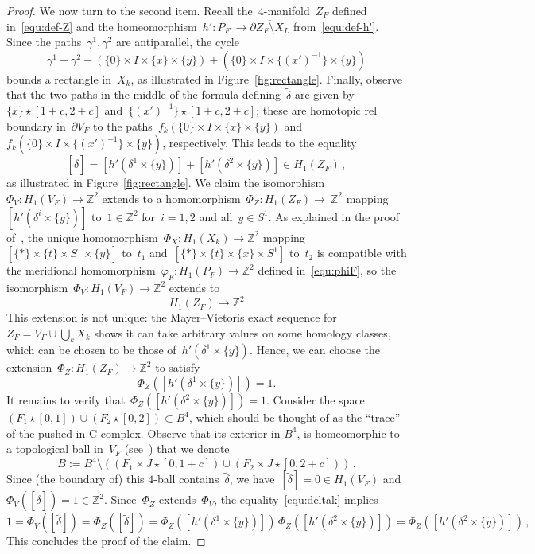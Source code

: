 \documentclass[10.9pt,a4paper]{amsart}
\theoremstyle{definition}
\theoremstyle{remark}
\newcommand{\Z}{\mathbb{Z}}
\begin{document}
\begin{proof}
We now turn to the second item.
Recall the~$4$-manifold~$Z_F$ defined in~\eqref{equ:def-Z} and the homeomorphism~$h' \colon P_{F'} \to \overline{\partial Z_F\setminus X_L}$ from~\eqref{equ:def-h'}.
Since the paths~$\gamma^1,\gamma^2$ are antiparallel, the cycle
\[
\gamma^1+\gamma^2-\left(\{0\}\times I\times\{x\}\times\{y\}\right)+\left(\{0\}\times I\times\{(x')^{-1}\}\times\{y\}\right)
\]
bounds a rectangle in~$X_k$, as illustrated in Figure~\ref{fig:rectangle}.
Finally, observe that the two paths in the middle of the formula defining~$\tilde\delta$ are given by~$\{x\}\star[1+c,2+c]$
and~$\{(x')^{-1}\}\star[1+c,2+c]$; these are homotopic rel boundary in~$\partial V_F$ to the paths~$f_k(\{0\}\times I\times\{x\}\times\{y\})$ and~$f_k(\{0\}\times I\times\{(x')^{-1}\}\times\{y\})$, respectively.
This leads to the equality
\begin{equation}
\label{equ:deltak}
[\tilde \delta]=[h'(\delta^1\times\{y\})]+[h'(\delta^2\times\{y\})]\in H_1(Z_F)\,,
\end{equation}
as illustrated in Figure~\ref{fig:rectangle}.
We claim the isomorphism~$\Phi_V \colon H_1(V_F) \to \Z^2$ 
extends to a homomorphism~$\Phi_Z \colon H_1(Z_F) \to~\Z^2$
mapping~$[h'(\delta^i \times \{y\})]$ to~$1\in \Z^2$ for~$i=1,2$ and all~$y\in S^1$.
As explained in the proof of~\cite[Lemma~4.9]{ConwayNagelToffoli}, the unique homomorphism~$\Phi_X \colon H_1(X_{k}) \to \Z^2$ mapping~$[\{\ast\} \times \{t\} \times S^1 \times \{y\}]$ to~$t_1$ and~$[\{\ast\} \times \{t\} \times \{x\} \times S^1]$ to~$t_2$ is compatible with the meridional homomorphism~$\varphi_F\colon H_1(P_F) \to\Z^2$ defined in~\eqref{equ:phiF}, so the isomorphism~$\Phi_V\colon H_1(V_F) \to \Z^2$ extends to 
$$H_1(Z_F) \to \Z^2$$
This extension is not unique: the Mayer--Vietoris exact sequence for~$Z_F=V_F\cup\bigcup_k X_k$ shows it can take arbitrary values on some homology classes, which can be chosen to be those of~$h'(\delta^1 \times \{y\})$. Hence, we can choose the extension~$\Phi_Z \colon H_1(Z_F) \to \Z^2$ to satisfy
$$\Phi_Z([h'(\delta^1\times\{y\})]) = 1.$$
It remains to verify that~$\Phi_Z([h'(\delta^2\times\{y\})])=1$.
Consider the space~$(F_1\star[0,1])\cup(F_2\star[0,2])\subset B^4$, which should be thought of
as the ``trace'' of the pushed-in C-complex. 
Observe that its exterior
in $B^4$, is homeomorphic to a topological ball in~$V_F$ (see~\cite[Section~3.1]{CFT18}) that we denote
\[
B:=B^4\setminus((F_1 \times J \star[0,1+c])\cup(F_2 \times J \star [0,2+c]))\,.
\]
Since (the boundary of) this $4$-ball contains~$\tilde \delta$, we have~$[\tilde \delta]=0\in H_1(V_F)$
and~$\Phi_V([\tilde \delta]) = 1\in\Z^2$. 
Since~$\Phi_Z$ extends~$\Phi_V$, the equality~\eqref{equ:deltak} implies
\[
1 = \Phi_V([\tilde \delta]) = \Phi_Z([\tilde \delta]) = \Phi_Z([h'(\delta^1\times\{y\})]) \, \Phi_Z([h'(\delta^2\times\{y\})]) = \Phi_Z([h'(\delta^2\times\{y\})])\,,
\]
This concludes the proof of the claim.


\end{proof}
\end{document}
